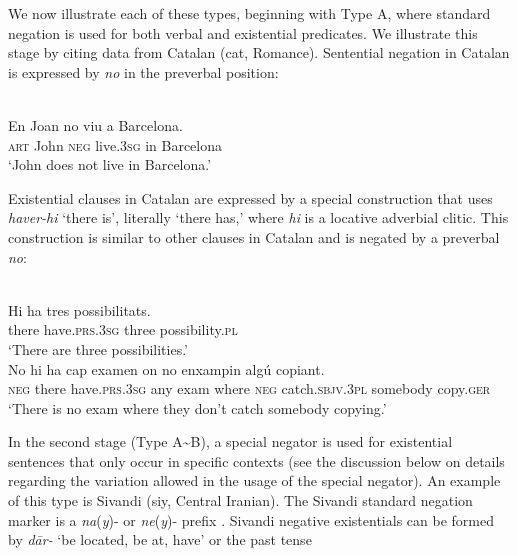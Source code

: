 \documentclass[output=paper,colorlinks,citecolor=brown]{langscibook}
\begin{document}
We now illustrate each of these types, beginning with Type A, where standard negation is used for both verbal and existential predicates. We illustrate this stage by citing data from Catalan (cat, Romance). Sentential negation in Catalan is expressed by \textit{no} in the preverbal position: 
%
\begin{exe}\ex\label{ex:ieur-catalan-Barcelona}
\\
    \gll En    Joan   no     viu          a   Barcelona. \\
\textsc{art}  John    \textsc{neg}   live.\textsc{3sg}   in Barcelona \\
    \glt `John does not live in Barcelona.' %
    \end{exe}
%
Existential clauses in Catalan are expressed by a special construction that uses \textit{haver-hi} `there is', literally `there has,' where \textit{hi} is a locative adverbial clitic. This construction is similar to other clauses in Catalan and is negated by a preverbal \textit{no}: 
%
\begin{exe}\ex\label{ex:ieur-catalan-possibilities}
\\
    \gll Hi      ha                  tres   possibilitats.  \\
there have.\textsc{prs}.\textsc{3sg} three possibility.\textsc{pl} \\
    \glt `There are three possibilities.' 
\ex\label{ex:ieur-catalan-copying}
\\
    \gll No hi ha cap examen on no enxampin algú copiant.  \\
\textsc{neg}   there have.\textsc{prs.3sg}   any exam 
where \textsc{neg}   catch.\textsc{sbjv.3pl}   somebody  copy.\textsc{ger}\\
    \glt `There is no exam where they don't catch somebody copying.' 
    \end{exe}
%
In the second stage (Type A{\textasciitilde}B), a special negator is used
for existential sentences that only occur in specific contexts (see the
discussion below on details regarding the variation allowed in the usage of
the special negator). An example of this type is Sivandi (siy, Central
Iranian). The Sivandi standard negation marker is a \textit{na}(\textit{y})- or
\textit{ne}(\textit{y})- prefix \citep[69]{Lecoq1979}. Sivandi negative existentials
can be formed by \textit{dār-} `be located, be at, have' or the past tense
\end{document}
